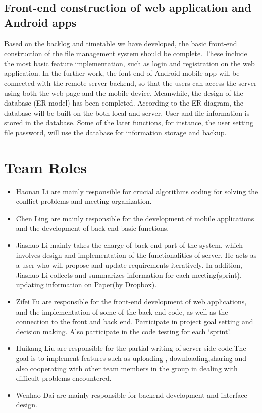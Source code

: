 \documentclass[a4paper,11pt]{article}
\begin{document}
\subsection{Front-end construction of web application and Android apps}
Based on the backlog and timetable we have developed, the basic front-end construction of the file management system should be complete. These include the most basic feature implementation, such as login and registration on the web application. In the further work, the font end of Android mobile app will be connected with the remote server backend, so that the users can access the server using both the web page and the mobile device. Meanwhile, the design of the database (ER model) has been completed. According to the ER diagram, the database will be built on the both local and server. User and file information is stored in the database. Some of the later functions, for instance, the user setting file password, will use the database for information storage and backup.
\section{Team Roles}
\begin{itemize}
\item Haonan Li are mainly responsible for crucial algorithms coding for solving the conflict problems and meeting organization.
\item Chen Ling are mainly responsible for the development of mobile applications and the development of back-end basic functions.
\item Jiashuo Li mainly takes the charge of back-end part of the system, which involves design and implementation of the functionalities of server. He acts as a user who will propose and update requirements iteratively. In addition, Jiashuo Li collects and summarizes information for each meeting(sprint), updating information on Paper(by Dropbox).
\item Zifei Fu are responsible for the front-end development of web applications, and the implementation of some of the back-end code, as well as the connection to the front and back end. Participate in project goal setting and decision making. Also participate in the code testing for each ‘sprint’.
\item Huikang Liu are responsible for the  partial writing of server-side code.The goal is to implement features such as uploading , downloading,sharing and also cooperating with other team members in the group in dealing  with difficult problems encountered.
\item Wenhao Dai are mainly responsible for backend development and interface design.
\end{itemize}
\end{document}
